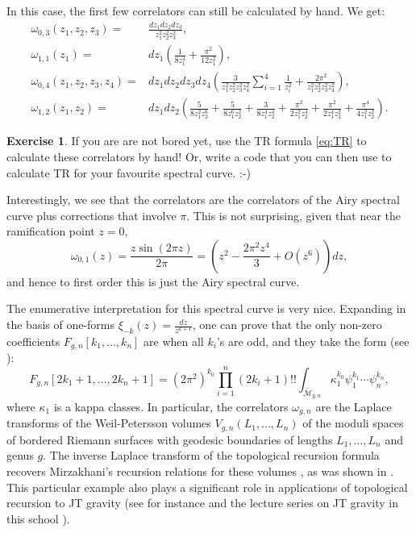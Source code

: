 \documentclass[reqno,oneside,11pt]{amsart}
\theoremstyle{plain}
\theoremstyle{definition}
\newtheorem*{exercise}{Exercise}
\theoremstyle{remark}
\numberwithin{equation}{section}
\begin{document}
In this case, the first few correlators can still be calculated by hand. We get:
\begin{align}
\omega_{0,3}(z_1,z_2,z_3) =& \frac{dz_1 dz_2 dz_3}{z_1^2 z_2^2 z_3^2},\\
\omega_{1,1}(z_1) =& dz_1 \left( \frac{1}{8 z_1^4} + \frac{\pi^2}{12 z_1^2} \right),\\
\omega_{0,4}(z_1,z_2,z_3,z_4) =&dz_1 dz_2 dz_3 dz_4 \left(  \frac{3}{z_1^2 z_2^2 z_3^2 z_4^2} \sum_{i=1}^4 \frac{1}{z_i^2} + \frac{2 \pi^2}{z_1^2 z_2^2  z_3^2 z_4^2}\right),\\
\omega_{1,2}(z_1, z_2) =&dz_1 dz_2 \left( \frac{5}{8 z_1^2 z_2^6} + \frac{5}{8 z_1^6 z_2^2} + \frac{3}{8 z_1^4 z_2^4} + \frac{\pi^2}{2 z_1^2 z_2^4} + \frac{\pi^2}{2 z_1^4 z_2^2} + \frac{\pi^4}{4 z_1^2 z_2^2} \right).
\end{align}

\begin{exercise}
If you are are not bored yet, use the TR formula \eqref{eq:TR} to calculate these correlators by hand! Or, write a code that you can then use to calculate TR for your favourite spectral curve. :-)
\end{exercise}

Interestingly, we see that the correlators are the correlators of the Airy spectral curve plus corrections that involve $\pi$. This is not surprising, given that near the ramification point $z=0$,
\begin{equation}
\omega_{0,1}(z)= \frac{z \sin(2 \pi z)}{2 \pi} = \left( z^2 - \frac{2 \pi^2 z^4}{3} + O(z^6) \right) dz,
\end{equation}
and hence to first order this is just the Airy spectral curve.

The enumerative interpretation for this spectral curve is very nice. Expanding in the basis of one-forms $\xi_{-k}(z) = \frac{dz}{z^{k+1}}$, one can prove that the only non-zero coefficients $F_{g,n}[k_1,\ldots,k_n]$ are when all $k_i$'s are odd, and they take the form (see  \cite{EO07c,EO08}):
\begin{equation}
F_{g,n}[2k_1+1, \ldots, 2k_n+1] =(2 \pi^2)^{k_0} \prod_{i=1}^n (2k_i+1)!! \int_{\overline{\mathcal{M}}_{g,n}} \kappa_1^{k_0} \psi_1^{k_1} \cdots \psi_n^{k_n},
\end{equation}
where $\kappa_1$ is a kappa classes. In particular, the correlators $\omega_{g,n}$ are the Laplace transforms of the Weil-Petersson volumes $V_{g,n}(L_1,\ldots,L_n)$ of the moduli spaces of bordered Riemann surfaces with geodesic boundaries of lengths $L_1,\ldots,L_n$ and genus $g$. The inverse Laplace transform of the topological recursion formula recovers Mirzakhani's recursion relations for these volumes \cite{Mi07}, as was shown in \cite{EO07c}. This particular example also plays a significant role in applications of topological recursion to JT gravity (see for instance \cite{SSS19} and the lecture series on JT gravity in this school \cite{Tu24}).
\end{document}
